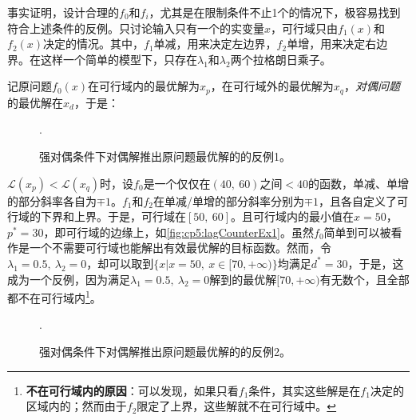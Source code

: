事实证明，设计合理的$f_0$和$f_i$，尤其是在限制条件不止1个的情况下，极容易找到符合上述条件的反例。只讨论输入只有一个的实变量$x$，可行域只由$f_1(x)$和$f_2(x)$决定的情况。其中，$f_1$单减，用来决定左边界，$f_2$单增，用来决定右边界。在这样一个简单的模型下，只存在$\lambda_1$和$\lambda_2$两个拉格朗日乘子。

记原问题$f_0(x)$在可行域内的最优解为$x_p$，在可行域外的最优解为$x_q$，\emph{对偶问题}的最优解在$x_d$，于是：

\begin{figure}[htbp]
	\centering
	\begin{minipage}[b]{0.48\textwidth}
	\end{minipage}
	\begin{minipage}[b]{0.48\textwidth}
	\end{minipage}
	\DeclareGraphicsExtensions.
	\caption{强对偶条件下对偶解推出原问题最优解的的反例1。}
	\label{fig:cp5:lagCounterEx1}
\end{figure}

$\mathcal{L}(x_p)<\mathcal{L}(x_q)$时，设$f_0$是一个仅仅在$(40,~60)$之间$<40$的函数，单减、单增的部分斜率各自为$\mp 1$。$f_1$和$f_2$在单减/单增的部分斜率分别为$\mp 1$，且各自定义了可行域的下界和上界。于是，可行域在$[50,~60]$。且可行域内的最小值在$x=50$，$p^{\ast}=30$，即可行域的边缘上，如\autoref{fig:cp5:lagCounterEx1}。虽然$f_0$简单到可以被看作是一个不需要可行域也能解出有效最优解的目标函数。然而，令$\lambda_1=0.5,~\lambda_2=0$，却可以取到$\{x|x=50,~x\in[70,+\infty)\}$均满足$d^{\ast}=30$，于是，这成为一个反例，因为满足$\lambda_1=0.5,~\lambda_2=0$解到的最优解$[70,+\infty)$有无数个，且全部都不在可行域内\footnote{\textbf{不在可行域内的原因}：可以发现，如果只看$f_1$条件，其实这些解是在$f_1$决定的区域内的；然而由于$f_2$限定了上界，这些解就不在可行域中。}。

\begin{figure}[htbp]
	\centering
	\begin{minipage}[b]{0.48\textwidth}
	\end{minipage}
	\begin{minipage}[b]{0.48\textwidth}
	\end{minipage}
	\DeclareGraphicsExtensions.
	\caption{强对偶条件下对偶解推出原问题最优解的的反例2。}
	\label{fig:cp5:lagCounterEx2}
\end{figure}

